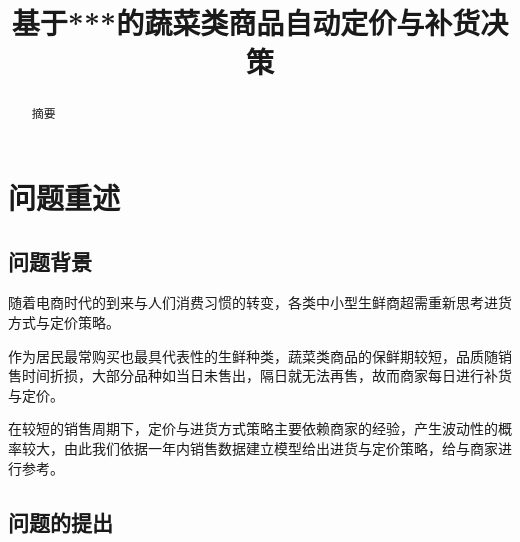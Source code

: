 \documentclass[withoutpreface,bwprint]{cumcmthesis} %
\title{基于***的蔬菜类商品自动定价与补货决策}
\begin{document}
\maketitle
 \begin{abstract}
摘要






\end{abstract}


\section{问题重述}

\subsection{问题背景}
随着电商时代的到来与人们消费习惯的转变，各类中小型生鲜商超需重新思考进货方式与定价策略。

作为居民最常购买也最具代表性的生鲜种类，蔬菜类商品的保鲜期较短，品质随销售时间折损，大部分品种如当日未售出，隔日就无法再售，故而商家每日进行补货与定价。

在较短的销售周期下，定价与进货方式策略主要依赖商家的经验，产生波动性的概率较大，由此我们依据一年内销售数据建立模型给出进货与定价策略，给与商家进行参考。

\subsection{问题的提出}
\end{document}
